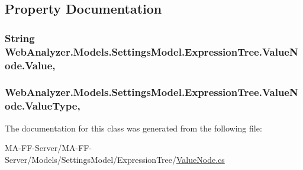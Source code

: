 \subsection{Property Documentation}
\hypertarget{class_web_analyzer_1_1_models_1_1_settings_model_1_1_expression_tree_1_1_value_node_abc4f8ff5dd972ce1c49f135273797926}{}
\subsubsection[{Value}]{\setlength{\rightskip}{0pt plus 5cm}String Web\+Analyzer.\+Models.\+Settings\+Model.\+Expression\+Tree.\+Value\+Node.\+Value\hspace{0.3cm}{\ttfamily [get]}, {\ttfamily [set]}}\label{class_web_analyzer_1_1_models_1_1_settings_model_1_1_expression_tree_1_1_value_node_abc4f8ff5dd972ce1c49f135273797926}
\hypertarget{class_web_analyzer_1_1_models_1_1_settings_model_1_1_expression_tree_1_1_value_node_aa1c55c593ae80ac78221c1397ede5ab2}{}
\subsubsection[{Value\+Type}]{ Web\+Analyzer.\+Models.\+Settings\+Model.\+Expression\+Tree.\+Value\+Node.\+Value\+Type\hspace{0.3cm}{\ttfamily [get]}, {\ttfamily [set]}}\label{class_web_analyzer_1_1_models_1_1_settings_model_1_1_expression_tree_1_1_value_node_aa1c55c593ae80ac78221c1397ede5ab2}


The documentation for this class was generated from the following file\+:\begin{DoxyCompactItemize}
\item 
M\+A-\/\+F\+F-\/\+Server/\+M\+A-\/\+F\+F-\/\+Server/\+Models/\+Settings\+Model/\+Expression\+Tree/\hyperlink{_value_node_8cs}{Value\+Node.\+cs}\end{DoxyCompactItemize}
